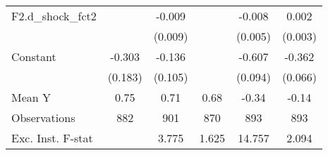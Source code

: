 {\begin{tabular}{l*{5}{c}}
\addlinespace
F2.d\_shock\_fct2     &                     &      -0.009         &                     &      -0.008         &       0.002         \\
                    &                     &     (0.009)         &                     &     (0.005)         &     (0.003)         \\
\addlinespace
Constant            &      -0.303         &      -0.136         &                     &      -0.607\sym{***}&      -0.362\sym{***}\\
                    &     (0.183)         &     (0.105)         &                     &     (0.094)         &     (0.066)         \\
\midrule
Mean Y              &        0.75         &        0.71         &        0.68         &       -0.34         &       -0.14         \\
Observations        &         882         &         901         &         870         &         893         &         893         \\
Exc. Inst. F-stat   &                     &       3.775         &       1.625         &      14.757         &       2.094         \\
\bottomrule
\end{tabular}
}
